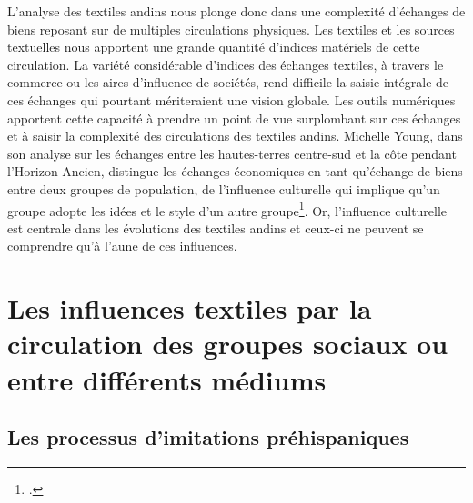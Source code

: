 L'analyse des textiles andins nous plonge donc dans une complexité d'échanges de biens reposant sur de multiples circulations physiques. Les textiles et les sources textuelles nous apportent une grande quantité d'indices matériels de cette circulation. La variété considérable d'indices des échanges textiles, à travers le commerce ou les aires d'influence de sociétés, rend difficile la saisie intégrale de ces échanges qui pourtant mériteraient une vision globale. Les outils numériques apportent cette capacité à prendre un point de vue surplombant sur ces échanges et à saisir la complexité des circulations des textiles andins. Michelle Young, dans son analyse sur les échanges entre les hautes-terres centre-sud et la côte pendant l'Horizon Ancien, distingue les échanges économiques en tant qu'échange de biens entre deux groupes de population, de l'influence culturelle qui implique qu'un groupe adopte les idées et le style d'un autre groupe\footcite[p.~10]{youngMontanaMarIntercambio2017}. Or, l'influence culturelle est centrale dans les évolutions des textiles andins et ceux-ci ne peuvent se comprendre qu'à l'aune de ces influences.



\section[Influences textiles]{Les influences textiles par la circulation des groupes sociaux ou entre différents médiums}

\subsection{Les processus d'imitations préhispaniques}

